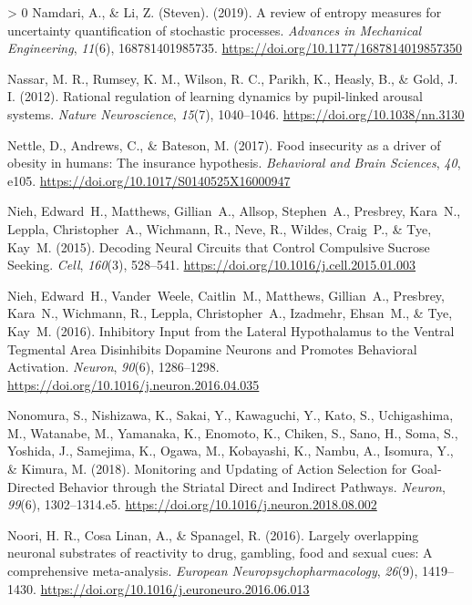 \documentclass[
]{/home/nicoluarte/Downloads/templates/PNAS-template-main.tex}
\newlength{\cslhangindent}
\newenvironment{CSLReferences}[3] %
 {%
  \setlength{\parindent}{0pt}
  \ifodd #1 \everypar{\setlength{\hangindent}{\cslhangindent}}\ignorespaces\fi
  \ifnum #2 > 0
  \setlength{\parskip}{#2\baselineskip}
  \fi
 }%
 {}
\begin{document}
\begin{CSLReferences}{1}{0}
\leavevmode\hypertarget{ref-X596XYG3}{}%
Namdari, A., \& Li, Z. (Steven). (2019). A review of entropy measures
for uncertainty quantification of stochastic processes. \emph{Advances
in Mechanical Engineering}, \emph{11}(6), 168781401985735.
\url{https://doi.org/10.1177/1687814019857350}

\leavevmode\hypertarget{ref-U2GSF8HI}{}%
Nassar, M. R., Rumsey, K. M., Wilson, R. C., Parikh, K., Heasly, B., \&
Gold, J. I. (2012). Rational regulation of learning dynamics by
pupil-linked arousal systems. \emph{Nature Neuroscience}, \emph{15}(7),
1040--1046. \url{https://doi.org/10.1038/nn.3130}

\leavevmode\hypertarget{ref-A9R3LNZJ}{}%
Nettle, D., Andrews, C., \& Bateson, M. (2017). Food insecurity as a
driver of obesity in humans: The insurance hypothesis. \emph{Behavioral
and Brain Sciences}, \emph{40}, e105.
\url{https://doi.org/10.1017/S0140525X16000947}

\leavevmode\hypertarget{ref-HT5LXV4U}{}%
Nieh, Edward~H., Matthews, Gillian~A., Allsop, Stephen~A., Presbrey,
Kara~N., Leppla, Christopher~A., Wichmann, R., Neve, R., Wildes,
Craig~P., \& Tye, Kay~M. (2015). Decoding Neural Circuits that Control
Compulsive Sucrose Seeking. \emph{Cell}, \emph{160}(3), 528--541.
\url{https://doi.org/10.1016/j.cell.2015.01.003}

\leavevmode\hypertarget{ref-GZ3AZ6UU}{}%
Nieh, Edward~H., Vander~Weele, Caitlin~M., Matthews, Gillian~A.,
Presbrey, Kara~N., Wichmann, R., Leppla, Christopher~A., Izadmehr,
Ehsan~M., \& Tye, Kay~M. (2016). Inhibitory Input from the Lateral
Hypothalamus to the Ventral Tegmental Area Disinhibits Dopamine Neurons
and Promotes Behavioral Activation. \emph{Neuron}, \emph{90}(6),
1286--1298. \url{https://doi.org/10.1016/j.neuron.2016.04.035}

\leavevmode\hypertarget{ref-4F2PUL7U}{}%
Nonomura, S., Nishizawa, K., Sakai, Y., Kawaguchi, Y., Kato, S.,
Uchigashima, M., Watanabe, M., Yamanaka, K., Enomoto, K., Chiken, S.,
Sano, H., Soma, S., Yoshida, J., Samejima, K., Ogawa, M., Kobayashi, K.,
Nambu, A., Isomura, Y., \& Kimura, M. (2018). Monitoring and Updating of
Action Selection for Goal-Directed Behavior through the Striatal Direct
and Indirect Pathways. \emph{Neuron}, \emph{99}(6), 1302--1314.e5.
\url{https://doi.org/10.1016/j.neuron.2018.08.002}

\leavevmode\hypertarget{ref-HM4RM78V}{}%
Noori, H. R., Cosa Linan, A., \& Spanagel, R. (2016). Largely
overlapping neuronal substrates of reactivity to drug, gambling, food
and sexual cues: A comprehensive meta-analysis. \emph{European
Neuropsychopharmacology}, \emph{26}(9), 1419--1430.
\url{https://doi.org/10.1016/j.euroneuro.2016.06.013}


\end{CSLReferences}
\end{document}
